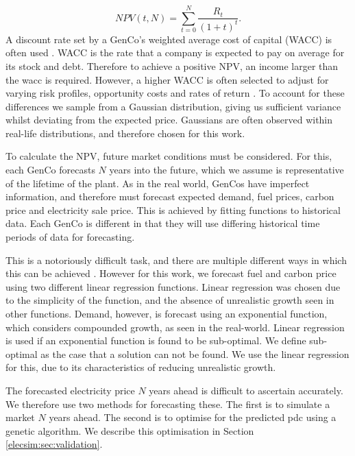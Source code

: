 \begin{equation} \label{architecture:eq:npv_eq}
NPV(t, N) = \sum_{t=0}^{N}\frac{R_t}{(1+t)^t}.
\end{equation}
A discount rate set by a GenCo's weighted average cost of capital (WACC) is often used \cite{KincheloeStephenC1990TWAC}. WACC is the rate that a company is expected to pay on average for its stock and debt. Therefore to achieve a positive NPV, an income larger than the \acrshort{wacc} is required. However, a higher WACC is often selected to adjust for varying risk profiles, opportunity costs and rates of return \cite{KincheloeStephenC1990TWAC}. To account for these differences we sample from a Gaussian distribution, giving us sufficient variance whilst deviating from the expected price. Gaussians are often observed within real-life distributions, and therefore chosen for this work.

To calculate the NPV, future market conditions must be considered. For this, each GenCo forecasts $N$ years into the future, which we assume is representative of the lifetime of the plant. As in the real world, GenCos have imperfect information, and therefore must forecast expected demand, fuel prices, carbon price and electricity sale price. This is achieved by fitting functions to historical data. Each GenCo is different in that they will use differing historical time periods of data for forecasting.

This is a notoriously difficult task, and there are multiple different ways in which this can be achieved \cite{Tao2021}. However for this work, we forecast fuel and carbon price using two different linear regression functions. Linear regression was chosen due to the simplicity of the function, and the absence of unrealistic growth seen in other functions. Demand, however, is forecast using an exponential function, which considers compounded growth, as seen in the real-world. Linear regression is used if an exponential function is found to be sub-optimal. We define sub-optimal as the case that a solution can not be found. We use the linear regression for this, due to its characteristics of reducing unrealistic growth.

The forecasted electricity price $N$ years ahead is difficult to ascertain accurately. We therefore use two methods for forecasting these. The first is to simulate a market $N$ years ahead. The second is to optimise for the predicted \acrfull{pdc} using a genetic algorithm. We describe this optimisation in Section \ref{elecsim:sec:validation}.

